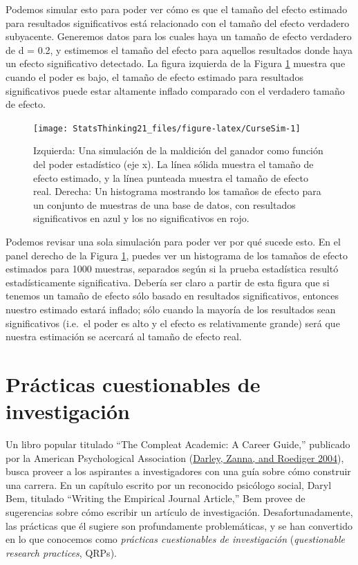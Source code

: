 \documentclass[
  12pt,
]{book}
\theoremstyle{definition}
\theoremstyle{definition}
\theoremstyle{definition}
\theoremstyle{remark}
\begin{document}
Podemos simular esto para poder ver cómo es que el tamaño del efecto estimado para resultados significativos está relacionado con el tamaño del efecto verdadero subyacente. Generemos datos para los cuales haya un tamaño de efecto verdadero de d = 0.2, y estimemos el tamaño del efecto para aquellos resultados donde haya un efecto significativo detectado. La figura izquierda de la Figura \ref{fig:CurseSim} muestra que cuando el poder es bajo, el tamaño de efecto estimado para resultados significativos puede estar altamente inflado comparado con el verdadero tamaño de efecto.

\begin{figure}
\texttt{[image: StatsThinking21\_files/figure-latex/CurseSim-1]} \caption{Izquierda: Una simulación de la maldición del ganador como función del poder estadístico (eje x). La línea sólida muestra el tamaño de efecto estimado, y la línea punteada muestra el tamaño de efecto real. Derecha: Un histograma mostrando los tamaños de efecto para un conjunto de muestras de una base de datos, con resultados significativos en azul y los no significativos en rojo. }\label{fig:CurseSim}
\end{figure}

Podemos revisar una sola simulación para poder ver por qué sucede esto. En el panel derecho de la Figura \ref{fig:CurseSim}, puedes ver un histograma de los tamaños de efecto estimados para 1000 muestras, separados según si la prueba estadística resultó estadísticamente significativa. Debería ser claro a partir de esta figura que si tenemos un tamaño de efecto sólo basado en resultados significativos, entonces nuestro estimado estará inflado; sólo cuando la mayoría de los resultados sean significativos (i.e.~el poder es alto y el efecto es relativamente grande) será que nuestra estimación se acercará al tamaño de efecto real.

\hypertarget{pruxe1cticas-cuestionables-de-investigaciuxf3n}{%
\section{Prácticas cuestionables de investigación}\label{pruxe1cticas-cuestionables-de-investigaciuxf3n}}

Un libro popular titulado ``The Compleat Academic: A Career Guide,'' publicado por la American Psychological Association (\protect\hyperlink{ref-darl:zann:roed:2004}{Darley, Zanna, and Roediger 2004}), busca proveer a los aspirantes a investigadores con una guía sobre cómo construir una carrera. En un capítulo escrito por un reconocido psicólogo social, Daryl Bem, titulado ``Writing the Empirical Journal Article,'' Bem provee de sugerencias sobre cómo escribir un artículo de investigación. Desafortunadamente, las prácticas que él sugiere son profundamente problemáticas, y se han convertido en lo que conocemos como \emph{prácticas cuestionables de investigación} (\emph{questionable research practices}, QRPs).
\end{document}
